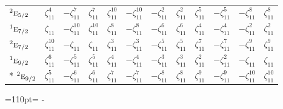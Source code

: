 \documentclass[10pt,a4paper]{article}
\newcommand{\needspace}[1]{\par\penalty-100\begingroup\dimen0=#1\relax\dimen2=\pagegoal
  \advance\dimen2-\pagetotal\ifdim\dimen0>\dimen2\relax\ifdim\dimen2>0pt\vfil\break\fi\fi
  \endgroup}
\numberwithin{equation}{section}
\newcommand{\irr}[1]{\text{\normalfont\scshape #1}}
\newcommand{\conjpair}[1]{{}^{#1}}
\newcommand{\rootunity}[1]{\zeta_{#1}}
\begin{document}
{\begin{longtable}{@{}lccccccccccc@{}}
$\conjpair{2}\irr{e}_{5/2}$ & $\rootunity{11}^{4}$ & $-\rootunity{11}^{7}$ & $\rootunity{11}^{7}$ & $\rootunity{11}^{10}$ & $-\rootunity{11}^{10}$ & $-\rootunity{11}^{2}$ & $\rootunity{11}^{2}$ & $\rootunity{11}^{5}$ & $-\rootunity{11}^{5}$ & $-\rootunity{11}^{8}$ & $\rootunity{11}^{8}$\\
$\conjpair{1}\irr{e}_{7/2}$ & $\rootunity{11}$ & $-\rootunity{11}^{10}$ & $\rootunity{11}^{10}$ & $\rootunity{11}^{8}$ & $-\rootunity{11}^{8}$ & $-\rootunity{11}^{6}$ & $\rootunity{11}^{6}$ & $\rootunity{11}^{4}$ & $-\rootunity{11}^{4}$ & $-\rootunity{11}^{2}$ & $\rootunity{11}^{2}$\\
$\conjpair{2}\irr{e}_{7/2}$ & $\rootunity{11}^{10}$ & $-\rootunity{11}$ & $\rootunity{11}$ & $\rootunity{11}^{3}$ & $-\rootunity{11}^{3}$ & $-\rootunity{11}^{5}$ & $\rootunity{11}^{5}$ & $\rootunity{11}^{7}$ & $-\rootunity{11}^{7}$ & $-\rootunity{11}^{9}$ & $\rootunity{11}^{9}$\\
$\conjpair{1}\irr{e}_{9/2}$ & $\rootunity{11}^{6}$ & $-\rootunity{11}^{5}$ & $\rootunity{11}^{5}$ & $\rootunity{11}^{4}$ & $-\rootunity{11}^{4}$ & $-\rootunity{11}^{3}$ & $\rootunity{11}^{3}$ & $\rootunity{11}^{2}$ & $-\rootunity{11}^{2}$ & $-\rootunity{11}$ & $\rootunity{11}$\\*
$\conjpair{2}\irr{e}_{9/2}$ & $\rootunity{11}^{5}$ & $-\rootunity{11}^{6}$ & $\rootunity{11}^{6}$ & $\rootunity{11}^{7}$ & $-\rootunity{11}^{7}$ & $-\rootunity{11}^{8}$ & $\rootunity{11}^{8}$ & $\rootunity{11}^{9}$ & $-\rootunity{11}^{9}$ & $-\rootunity{11}^{10}$ & $\rootunity{11}^{10}$\\
\bottomrule\end{longtable}}
\needspace{110pt}
\end{document}
